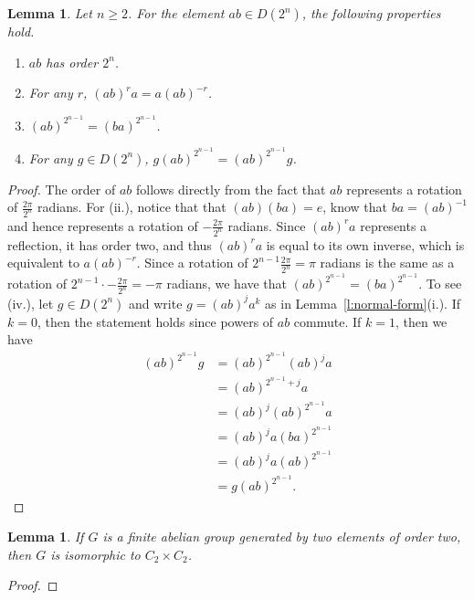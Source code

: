 \documentclass{amsart}
\numberwithin{equation} {section}
\newtheorem{lemma}[equation]{Lemma}
\theoremstyle{definition}
\begin{document}
\begin{lemma}\label{l:ab-order-lemma}
Let $n \geq 2$. For the element $ab \in D(2^n)$, the following properties hold. 
\begin{enumerate}
\item[(i.)] $ab$ has order $2^{n}$.
\item[(ii.)] For any $r$, $(ab)^{r}a = a(ab)^{-r}$. 
\item[(iii.)] $(ab)^{2^{n-1}} = (ba)^{2^{n-1}}$. 
\item[(iv.)] For any $g \in D(2^n)$, $g (ab)^{2^{n-1}} = (ab)^{2^{n-1}} g$. 
\end{enumerate}
\end{lemma}

\begin{proof}
The order of $ab$ follows directly from the fact that $ab$ represents a rotation of $\displaystyle\frac{2\pi}{2^n}$ radians.  For (ii.), notice that that $(ab)(ba) = e$, know that $ba = (ab)^{-1}$ and hence represents a rotation of  $-\displaystyle\frac{2\pi}{2^n}$ radians. Since $(ab)^r a$ represents a reflection, it has order two, and thus $(ab)^r a$ is equal to its own inverse, which is equivalent to $a (ab)^{-r}$. Since a rotation of $2^{n-1} \displaystyle\frac{2\pi}{2^n} = \pi$ radians is the same as a rotation of $ 2^{n-1} \cdot -\displaystyle\frac{2\pi}{2^n} = -\pi$ radians, we have that $(ab)^{2^{n-1}} = (ba)^{2^{n-1}}$. To see (iv.), let $g \in D(2^n)$ and write $g = (ab)^ja^k$ as in Lemma~\ref{l:normal-form}(i.). If $k = 0$, then the statement holds since powers of $ab$ commute. If $k = 1$, then we have 
\begin{align*}
(ab)^{2^{n-1}} g &= (ab)^{2^{n-1}} (ab)^j a \\
&= (ab)^{2^{n-1} +j} a \\
&= (ab)^j (ab)^{2^{n-1}} a  \\
&= (ab)^j a (ba)^{2^{n-1}} \\
&= (ab)^j a (ab)^{2^{n-1}} \\
&= g (ab)^{2^{n-1}}. 
\end{align*}
\end{proof}

\begin{lemma}\label{l:C2-C2-structure-lemma}
If $G$ is a finite abelian group generated by two elements of order two, then $G$ is isomorphic to $C_2 \times C_2$. 
\end{lemma}

\begin{proof}
 
\end{proof}
\end{document}
